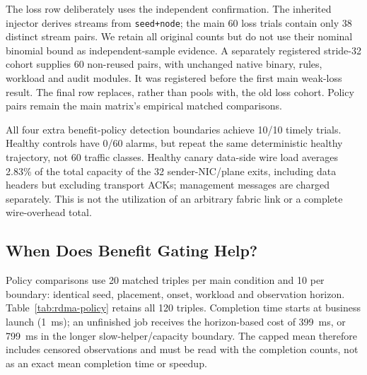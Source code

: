 \documentclass[sigconf]{acmart}
\begin{document}
The loss row deliberately uses the independent confirmation. The inherited
injector derives streams from \texttt{seed+node}; the main 60 loss trials
contain only 38 distinct stream pairs. We retain all original counts but
do not use their nominal binomial bound as independent-sample evidence.
A separately registered stride-32 cohort supplies 60 non-reused pairs,
with unchanged native binary, rules, workload and audit modules. It was
registered before the first main weak-loss result. The final row replaces,
rather than pools with, the old loss cohort. Policy pairs remain the main
matrix's empirical matched comparisons.

All four extra benefit-policy detection boundaries achieve 10/10 timely
trials. Healthy controls have 0/60 alarms, but repeat the same deterministic
healthy trajectory, not 60 traffic classes. Healthy canary data-side wire
load averages 2.83\% of the total capacity of the 32 sender-NIC/plane exits,
including data headers but excluding transport ACKs; management messages
are charged separately. This is not the utilization of an arbitrary fabric
link or a complete wire-overhead total.

\subsection{When Does Benefit Gating Help?}
\label{sec:native-policy-results}
Policy comparisons use 20 matched triples per main condition and 10 per
boundary: identical seed, placement, onset, workload and observation horizon.
Table~\ref{tab:rdma-policy} retains all 120 triples. Completion time starts
at business launch (1~ms); an unfinished job receives the horizon-based
cost of 399~ms, or 799~ms in the longer slow-helper/capacity boundary.
The capped mean therefore includes censored observations and must be read
with the completion counts, not as an exact mean completion time or speedup.
\end{document}

